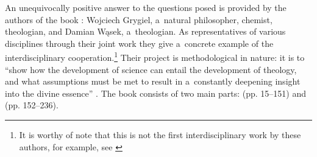 An unequivocally positive answer to the questions posed is provided by the authors of the book : Wojciech Grygiel, a~natural philosopher, chemist, theologian, and Damian Wąsek, a~theologian. As representatives of various disciplines through their joint work they give a~concrete example of the interdisciplinary cooperation.\footnote{It is worthy of note that this is not the first interdisciplinary work by these authors, for example, see 
\parencites[][]{wasek_teologia_2018}[][]{}[][]{grygiel_cognitive_2021}%
} Their project is methodological in nature: it is to ``show how the development of science can entail the development of theology, and what assumptions must be met to result in a~constantly deepening insight into the divine essence'' 
\parencite[][p.12]{grygiel_teologia_2022}. %
 The book consists of two main parts:  (pp. 15–151) and  (pp. 152–236).



